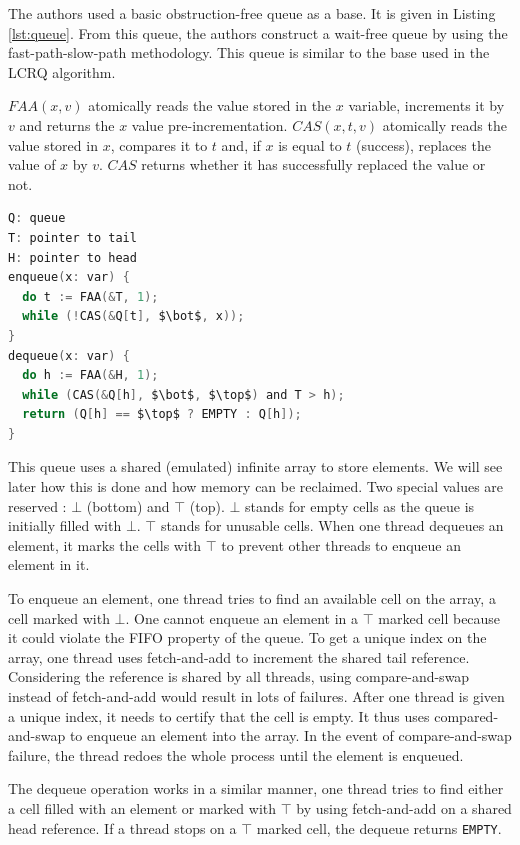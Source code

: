 The authors used a basic obstruction-free queue as a base. It is given in
Listing \ref{lst:queue}. From this queue, the authors construct a wait-free
queue by using the fast-path-slow-path methodology. This queue is similar to the
base used in the LCRQ algorithm.

$FAA(x, v)$ atomically reads the value stored in the $x$ variable, increments it
by $v$ and returns the $x$ value pre-incrementation. $CAS(x, t, v)$ atomically
reads the value stored in $x$, compares it to $t$ and, if $x$ is equal to $t$
(success), replaces the value of $x$ by $v$. $CAS$ returns whether it has
successfully replaced the value or not.

\begin{lstlisting}[mathescape,
                   frame=single,
                   caption={An obstruction-free queue using an infinite array.},
                   label={lst:queue},
                   language=C]
Q: queue
T: pointer to tail
H: pointer to head
enqueue(x: var) {
  do t := FAA(&T, 1);
  while (!CAS(&Q[t], $\bot$, x));
}
dequeue(x: var) {
  do h := FAA(&H, 1);
  while (CAS(&Q[h], $\bot$, $\top$) and T > h);
  return (Q[h] == $\top$ ? EMPTY : Q[h]);
}
\end{lstlisting}

 This queue uses a shared (emulated) infinite array to
store elements. We will see later how this is done and how memory can be
reclaimed. Two special values are reserved : $\bot$ (bottom) and $\top$ (top).
$\bot$ stands for empty cells as the queue is initially filled with $\bot$.
$\top$ stands for unusable cells. When one thread dequeues an element, it marks
the cells with $\top$ to prevent other threads to enqueue an element in it.

To enqueue an element, one thread tries to find an available cell on the array,
a cell marked with $\bot$. One cannot enqueue an element in a $\top$ marked cell
because it could violate the FIFO property of the queue. To get a unique index
on the array, one thread uses fetch-and-add to increment the shared tail
reference. Considering the reference is shared by all threads, using
compare-and-swap instead of fetch-and-add would result in lots of failures.
After one thread is given a unique index, it needs to certify that the cell is
empty. It thus uses compared-and-swap to enqueue an element into the array. In
the event of compare-and-swap failure, the thread redoes the whole process until
the element is enqueued.

The dequeue operation works in a similar manner, one thread tries to find either a
cell filled with an element or marked with $\top$ by using fetch-and-add on a
shared head reference. If a thread stops on a $\top$ marked cell, the dequeue
returns \texttt{EMPTY}.

